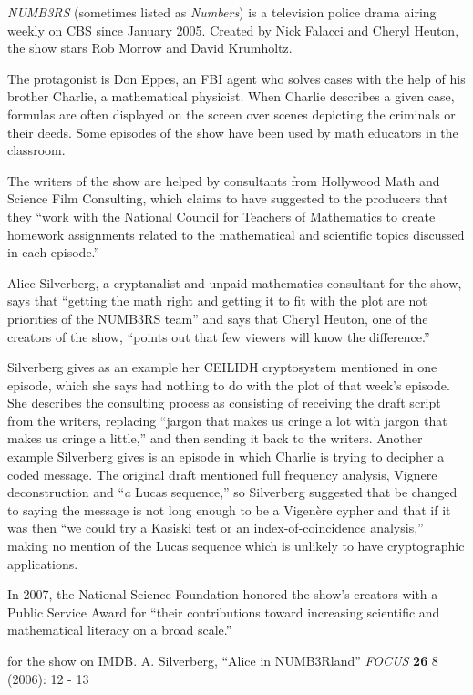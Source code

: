 \documentclass[12pt]{article}
\begin{document}
{\em NUMB3RS} (sometimes listed as {\em Numbers}) is a television police drama airing weekly on CBS since January 2005. Created by Nick Falacci and Cheryl Heuton, the show stars Rob Morrow and David Krumholtz.

The protagonist is Don Eppes, an FBI agent who solves cases with the help of his brother Charlie, a mathematical physicist. When Charlie describes a given case, formulas are often displayed on the screen over scenes depicting the criminals or their deeds. Some episodes of the show have been used by math educators in the classroom.

The writers of the show are helped by consultants from Hollywood Math and Science Film Consulting, which claims to have suggested to the producers that they ``work with the National Council for Teachers of Mathematics to create homework assignments related to the mathematical and scientific topics discussed in each episode.''

Alice Silverberg, a cryptanalist and unpaid mathematics consultant for the show, says that ``getting the math right and getting it to fit with the plot are not priorities of the NUMB3RS team'' and says that Cheryl Heuton, one of the creators of the show, ``points out that few viewers will know the difference.''

Silverberg gives as an example her CEILIDH cryptosystem mentioned in one episode, which she says had nothing to do with the plot of that week's episode. She describes the consulting process as consisting of receiving the draft script from the writers, replacing ``jargon that makes us cringe a lot with jargon that makes us cringe a little,'' and then sending it back to the writers. Another example Silverberg gives is an episode in which Charlie is trying to decipher a coded message. The original draft mentioned full frequency analysis, Vignere deconstruction and ``{\em a} Lucas sequence,'' so Silverberg suggested that be changed to saying the message is not long enough to be a Vigen\`ere cypher and that if it was then ``we could try a Kasiski test or an index-of-coincidence analysis,'' making no mention of the Lucas sequence which is unlikely to have cryptographic applications.

In 2007, the National Science Foundation honored the show's creators with a Public Service Award for ``their contributions toward increasing scientific and mathematical literacy on a broad scale.''

\begin{thebibliography}{1}
 
 
  for the show on IMDB.
 A. Silverberg, ``Alice in NUMB3Rland'' {\it FOCUS} {\bf 26} 8 (2006): 12 - 13
\end{thebibliography}
\end{document}
